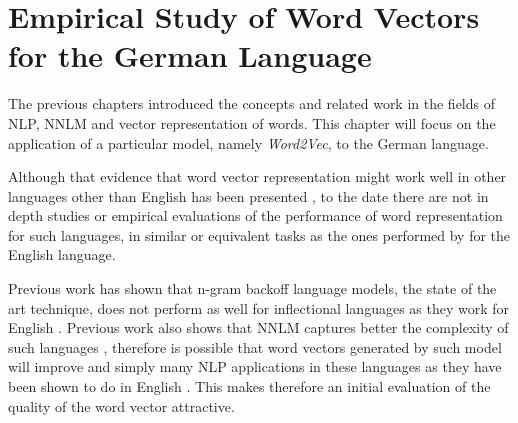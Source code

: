 \chapter{Empirical Study of Word Vectors for the German Language}
\label{chapter:wor2vec_german}











The previous chapters introduced the concepts and related work  in the fields
of  \ac{NLP}, \ac{NNLM} and vector representation of words. This chapter will
focus on the application of a particular model, namely \textit{Word2Vec}, to
the German language.  


Although that  evidence that word vector representation might work
well in other languages other than English has been presented
\cite{DBLP:journals/corr/MikolovLS13}, to the date  there are not in depth studies or empirical evaluations of the
performance of word representation for such languages,  in similar or equivalent tasks as the
ones performed by \cite{DBLP:journals/corr/abs-1301-3781} for the English
language. 

Previous work has shown that  n-gram backoff language models, the state of the art
technique, does not perform  as well for inflectional  languages as they work
for English \cite{conf/icassp/MikolovKBGC09}.  Previous work also shows that
\ac{NNLM} captures  better the complexity of such languages
\cite{conf/icassp/MikolovKBGC09}\cite{DBLP:journals/corr/MikolovLS13},
therefore  is possible that word vectors generated by such model  will 
improve  and simply many \ac{NLP} applications in
these languages as they have been shown to do in
English \cite{collobert:2008} \cite{Turian:2010:WRS:1858681.1858721}.  This makes therefore an initial evaluation of the quality of the word vector
attractive.

